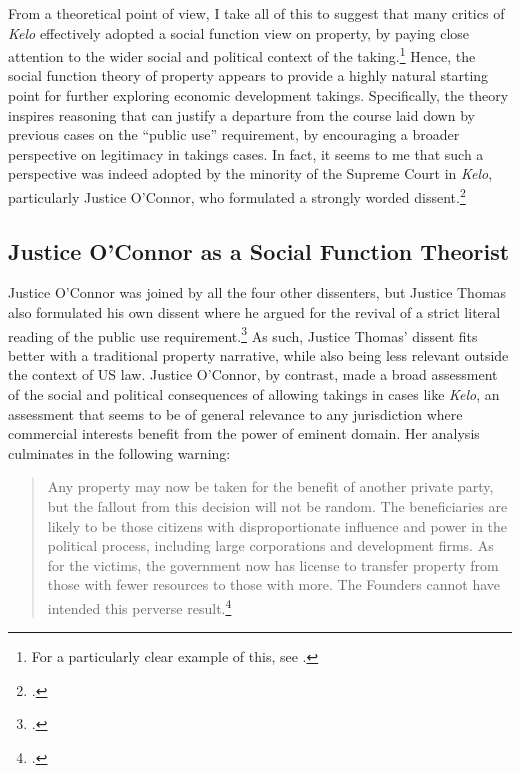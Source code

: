 From a theoretical point of view, I take all of this to suggest that many critics of {\it Kelo} effectively adopted a social function view on property, by paying close attention to the wider social and political context of the taking.\footnote{For a particularly clear example of this, see \cite{underkuffler06}.} Hence, the social function theory of property appears to provide a highly natural starting point for further exploring economic development takings. Specifically, the theory inspires reasoning that can justify a departure from the course laid down by previous cases on the ``public use'' requirement, by encouraging a broader perspective on legitimacy in takings cases. In fact, it seems to me that such a perspective was indeed adopted by the minority of the Supreme Court in {\it Kelo}, particularly Justice O'Connor, who formulated a strongly worded dissent.\footnote{\cite[494-505]{kelo05}.}

\subsection{Justice O'Connor as a Social Function Theorist}

Justice O'Connor was joined by all the four other dissenters, but Justice Thomas also formulated his own dissent where he argued for the revival of a strict literal reading of the public use requirement.\footnote{\cite[505-523]{kelo05}.} As such, Justice Thomas' dissent fits better with a traditional property narrative, while also being less relevant outside the context of US law. Justice O'Connor, by contrast, made a broad assessment of the social and political consequences of allowing takings in cases like {\it Kelo}, an assessment that seems to be of general relevance to any jurisdiction where commercial interests benefit from the power of eminent domain. Her analysis culminates in the following warning:

\begin{quote}
Any property may now be taken for the benefit of another private party, but the fallout from this decision will not be random. The beneficiaries are likely to be those citizens with disproportionate influence and power in the political process, including large corporations and development firms. As for the victims, the government now has license to transfer property from those with fewer resources to those with more. The Founders cannot have intended this perverse result.\footcite[505]{kelo05}
\end{quote}

